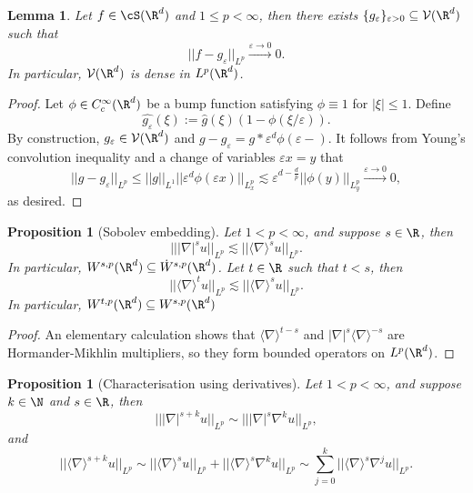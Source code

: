 \documentclass[reqno]{amsart}
\newtheorem{proposition}[theorem]{Proposition}
\newtheorem{lemma}[theorem]{Lemma}
\theoremstyle{definition}
\theoremstyle{remark}
\renewcommand{\epsilon}{\varepsilon}
\begin{document}
\begin{lemma}
	Let $f \in \cS(\R^d)$ and $1 \leq p < \infty$, then there exists $\{ g_\epsilon\}_{\epsilon > 0} \subseteq \mathcal V(\R^d)$ such that 
		\[ ||f - g_\epsilon||_{L^p} \overset{\epsilon \to 0}{\longrightarrow} 0. \]
	In particular, $\mathcal V (\R^d)$ is dense in $L^p (\R^d)$. 
\end{lemma}

\begin{proof}
	Let $\phi \in C^\infty_c (\R^d)$ be a bump function satisfying $\phi \equiv 1$ for $|\xi| \leq 1$. Define 
		\[ \widehat{g_\epsilon} (\xi) := \widehat g (\xi) (1 - \phi(\xi/\epsilon)). \]
	By construction, $g_\epsilon \in \mathcal V (\R^d)$ and $g - g_\epsilon = g * \epsilon^d \phi(\epsilon - )$. It follows from Young's convolution inequality and a change of variables $\epsilon x = y$ that 
		\[ ||g - g_\epsilon||_{L^p} \leq ||g||_{L^1} ||\epsilon^d \phi(\epsilon x)||_{L^p_x} \lesssim \epsilon^{d - \frac{d}{p}} ||\phi(y)||_{L^p_y} \overset{\epsilon \to 0}{\longrightarrow} 0,  \]
	as desired. 	
\end{proof}

\begin{proposition}[Sobolev embedding]
	Let $1 < p < \infty$, and suppose $s \in \R$, then 
		\[ |||\nabla|^s u||_{L^p} \lesssim ||\langle \nabla \rangle^s u||_{L^p}. \]
	In particular, $W^{s, p} (\R^d) \subseteq \dot W^{s, p} (\R^d)$. Let $t \in \R$ such that $t < s$, then 	
		\[ ||\langle \nabla \rangle^t u||_{L^p} \lesssim ||\langle \nabla\rangle^s u||_{L^p}. \]
	In particular, $W^{t, p} (\R^d) \subseteq W^{s, p} (\R^d)$	
\end{proposition}

\begin{proof}
	An elementary calculation shows that $\langle \nabla \rangle^{t - s}$ and $|\nabla|^s \langle \nabla \rangle^{-s}$ are Hormander-Mikhlin multipliers, so they form bounded operators on $L^p (\R^d)$.
\end{proof}

\begin{proposition}[Characterisation using derivatives]
	Let $1 < p < \infty$, and suppose $k \in \N$ and $s \in \R$, then 
		\[ |||\nabla|^{s + k} u||_{L^p} \sim || |\nabla|^s \nabla^k u||_{L^p}, \]
	and		
		\[ || \langle \nabla \rangle^{s + k} u||_{L^p} \sim || \langle \nabla \rangle^s u||_{L^p} + || \langle \nabla \rangle^s \nabla^k u ||_{L^p} \sim \sum_{j = 0}^k ||\langle \nabla \rangle^s \nabla^j u||_{L^p}.\]
\end{proposition}
\end{document}
